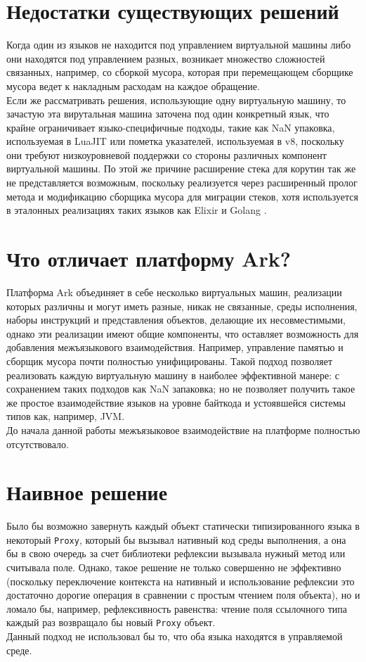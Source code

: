 \documentclass[times,specification,annotation]{itmo-student-thesis}
\begin{document}
\section{Недостатки существующих решений}
Когда один из языков не находится под управлением виртуальной машины либо они находятся под управлением разных, возникает множество сложностей связанных, например, со сборкой мусора, которая при перемещающем сборщике мусора ведет к накладным расходам на каждое обращение.\\
Если же рассматривать решения, использующие одну виртуальную машину, то зачастую эта вирутальная машина заточена под один конкретный язык, что крайне ограничивает языко-специфичные подходы, такие как NaN упаковка, используемая в LuaJIT или пометка указателей, используемая в v8\cite{v8-pointer-tagging}, поскольку они требуют низкоуровневой поддержки со стороны различных компонент виртуальной машины. По этой же причине расширение стека для корутин так же не представляется возможным, поскольку реализуется через расширенный пролог метода и модификацию сборщика мусора для миграции стеков, хотя используется в эталонных реализациях таких языков как Elixir и Golang \cite{golang-stack}.

\finishrelatedwork

\section{Что отличает платформу Ark?}
Платформа Ark объединяет в себе несколько виртуальных машин, реализации которых различны и могут иметь разные, никак не связанные, среды исполнения, наборы инструкций и представления объектов, делающие их несовместимыми, однако эти реализации имеют общие компоненты, что оставляет возможность для добавления межъязыкового взаимодействия. Например, управление памятью и сборщик мусора почти полностью унифицированы. Такой подход позволяет реализовать каждую виртуальную машину в наиболее эффективной манере: с сохранением таких подходов как NaN запаковка; но не позволяет получить такое же простое взаимодействие языков на уровне байткода и устоявшейся системы типов как, например, JVM.\\
До начала данной работы межъязыковое взаимодействие на платформе полностью отсутствовало.

\section{Наивное решение}
Было бы возможно завернуть каждый объект статически типизированного языка в некоторый \texttt{Proxy}, который бы вызывал нативный код среды выполнения, а она бы в свою очередь за счет библиотеки рефлексии вызывала нужный метод или считывала поле. Однако, такое решение не только совершенно не эффективно (поскольку переключение контекста на нативный и использование рефлексии это достаточно дорогие операция в сравнении с простым чтением поля объекта), но и ломало бы, например, рефлексивность равенства: чтение поля ссылочного типа каждый раз возвращало бы новый \texttt{Proxy} объект.\\
Данный подход не использовал бы то, что оба языка находятся в управляемой среде.
\end{document}
